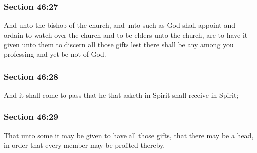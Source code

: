 	\subsubsection{Section 46:27} %
		\label{DC46-27}

		And unto the bishop of the church, and unto such as God shall appoint and ordain to watch over the church and to be elders unto the church, are to have it given unto them to discern all those gifts lest there shall be any among you professing and yet be not of God.


	\subsubsection{Section 46:28} %
		\label{DC46-28}

		And it shall come to pass that he that asketh in Spirit shall receive in Spirit;


	\subsubsection{Section 46:29} %
		\label{DC46-29}

		That unto some it may be given to have all those gifts, that there may be a head, in order that every member may be profited thereby.


